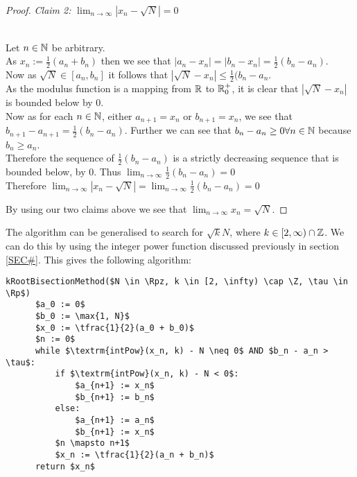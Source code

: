 \begin{proof}
\textit{Claim 2:} \(\lim_{n\to\infty}|x_n - \sqrt{N}| = 0\)
\begin{subproof}\\
Let \(n \in \mathbb{N}\) be arbitrary.\\
As \(x_n := \frac{1}{2}(a_n + b_n)\) then we see that \(|a_n - x_n| = |b_n - x_n| = \frac{1}{2}(b_n - a_n)\).\\
Now as \(\sqrt{N} \in [a_n, b_n]\) it follows that \(|\sqrt{N} - x_n| \le \frac{1}{2}(b_n - a_n\).\\
As the modulus function is a mapping from \(\mathbb{R}\) to \(\mathbb{R}^+_0\), it is clear that \(|\sqrt{N} - x_n|\) is bounded below by 0.\\
Now as for each \(n \in \mathbb{N}\), either \(a_{n+1} = x_n\) or \(b_{n+1} = x_n\), we see that \(b_{n+1} - a_{n+1} = \frac{1}{2}(b_n - a_n)\). Further we can see that \(b_n - a_n \ge 0 \forall n \in \mathbb{N}\) because \(b_n \ge a_n\).\\
Therefore the sequence of \(\frac{1}{2}(b_n - a_n)\) is a strictly decreasing sequence that is bounded below, by 0. Thus \(\lim_{n\to\infty} \frac{1}{2}(b_n - a_n) = 0\)\\ 
Therefore \(\lim_{n\to\infty} |x_n - \sqrt{N}| = \lim_{n\to\infty}\frac{1}{2}(b_n - a_n) = 0\)
\end{subproof}

By using our two claims above we see that \(\lim_{n\to\infty} x_n = \sqrt{N}\).
\end{proof}

The algorithm can be generalised to search for \(\sqrt{k}{N}\), where \(k \in [2,\infty) \cap \mathbb{Z}\). We can do this by using the integer power function discussed previously in section \ref{SEC#}. This gives the following algorithm:
 
\label{PCD_"Bisection Method for General Roots"}
\begin{lstlisting}[frame=single,mathescape,caption={Bisection Method for General Roots}]
  kRootBisectionMethod($N \in \Rpz, k \in [2, \infty) \cap \Z, \tau \in \Rp$)
      $a_0 := 0$
      $b_0 := \max{1, N}$
      $x_0 := \tfrac{1}{2}(a_0 + b_0)$
      $n := 0$
      while $\textrm{intPow}(x_n, k) - N \neq 0$ AND $b_n - a_n > \tau$:
          if $\textrm{intPow}(x_n, k) - N < 0$:
              $a_{n+1} := x_n$
              $b_{n+1} := b_n$
          else:
              $a_{n+1} := a_n$
              $b_{n+1} := x_n$
          $n \mapsto n+1$
          $x_n := \tfrac{1}{2}(a_n + b_n)$
      return $x_n$
\end{lstlisting}\\

